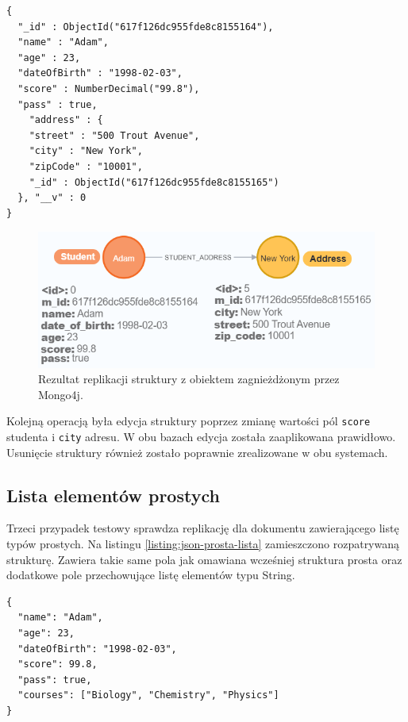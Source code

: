 \documentclass[a4paper,twoside,12pt]{book}
\begin{document}
\captionsetup{justification=centering}
\begin{lstlisting}[style=JSON, caption={Struktura dokumentu z obiektem zagnieżdżonym wstawiona przez Mongo4j.}, label={listing:dokument-zagnieżdżenie-mongo4j}, captionpos=b]
{
  "_id" : ObjectId("617f126dc955fde8c8155164"),
  "name" : "Adam",
  "age" : 23,
  "dateOfBirth" : "1998-02-03",
  "score" : NumberDecimal("99.8"),
  "pass" : true,
    "address" : {
    "street" : "500 Trout Avenue",
    "city" : "New York",
    "zipCode" : "10001",
    "_id" : ObjectId("617f126dc955fde8c8155165")
  }, "__v" : 0
}
\end{lstlisting}

\begin{figure}[!h]
\centering
\captionsetup{justification=centering}
\includegraphics[width=12cm]{images/zagnieżdżenie_mongo4j.png}
\caption{Rezultat replikacji struktury z obiektem zagnieżdżonym przez Mongo4j.}
\label{fig:graf-struktura-zagnieżdżenie-mongo4j}
\end{figure}

Kolejną operacją była edycja struktury poprzez zmianę wartości pól \texttt{score} studenta i \texttt{city} adresu. W obu bazach edycja została zaaplikowana prawidłowo. Usunięcie struktury również zostało poprawnie zrealizowane w obu systemach.

\subsection{Lista elementów prostych}

Trzeci przypadek testowy sprawdza replikację dla dokumentu zawierającego listę typów prostych.
Na listingu \ref{listing:json-prosta-lista} zamieszczono rozpatrywaną strukturę. Zawiera takie same pola jak omawiana wcześniej struktura prosta oraz dodatkowe pole przechowujące listę elementów typu String. 

\begin{lstlisting}[style=JSON, caption={Struktura dokumentu z listą prostych elementów.}, label={listing:json-prosta-lista}, captionpos=b !h]
{
  "name": "Adam",
  "age": 23,
  "dateOfBirth": "1998-02-03",
  "score": 99.8,	
  "pass": true,
  "courses": ["Biology", "Chemistry", "Physics"]
}
\end{lstlisting}
\end{document}
